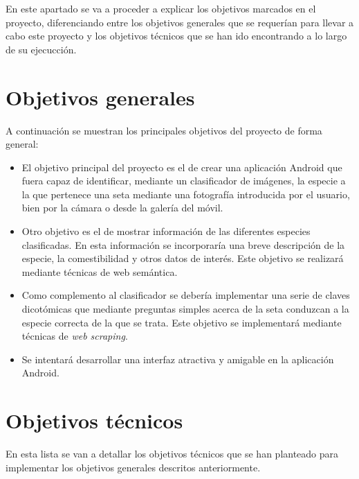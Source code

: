 
En este apartado se va a proceder a explicar los objetivos marcados en el proyecto, diferenciando entre los objetivos generales que se requerían para llevar a cabo este proyecto y los objetivos técnicos que se han ido encontrando a lo largo de su ejecucción.

\section{Objetivos generales}

A continuación se muestran los principales objetivos del proyecto de forma general:

\begin{itemize}
	\item El objetivo principal del proyecto es el de crear una aplicación Android que fuera capaz de identificar, mediante un clasificador de imágenes, la especie a la que pertenece una seta mediante una fotografía introducida por el usuario, bien por la cámara o desde la galería del móvil.
	\item Otro objetivo es el de mostrar información de las diferentes especies clasificadas. En esta información se incorporaría una breve descripción de la especie, la comestibilidad y otros datos de interés. Este objetivo se realizará mediante técnicas de web semántica.
	\item Como complemento al clasificador se debería implementar una serie de claves dicotómicas que mediante preguntas simples acerca de la seta conduzcan a la especie correcta de la que se trata. Este objetivo se implementará mediante técnicas de \textit{web scraping}.
	\item Se intentará desarrollar una interfaz atractiva y amigable en la aplicación Android.
\end{itemize}

\section{Objetivos técnicos}

En esta lista se van a detallar los objetivos técnicos que se han planteado para implementar los objetivos generales descritos anteriormente.

